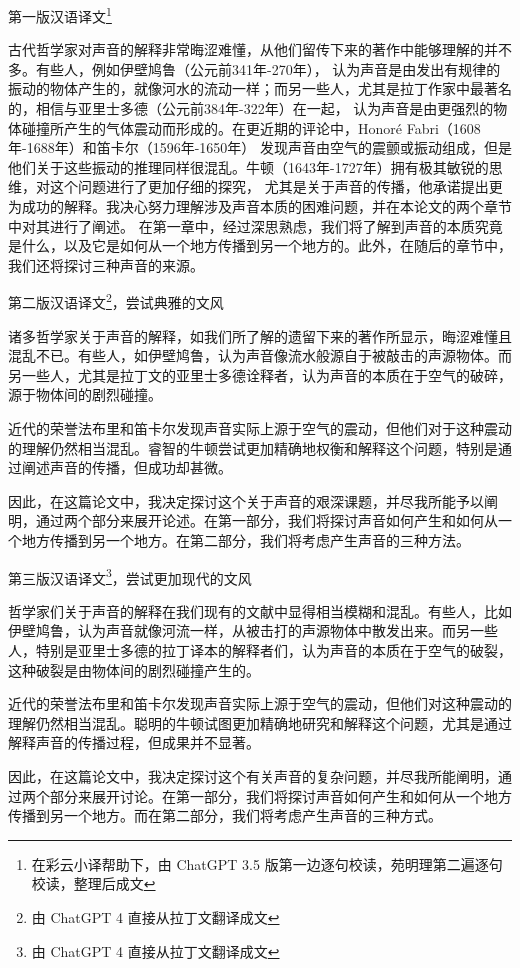 \documentclass[a4paper,12pt]{article}
\numberwithin{problem}{section}
\numberwithin{definition}{section}
\numberwithin{lemma}{section}
\numberwithin{proposition}{section}
\numberwithin{theorem}{section}
\numberwithin{grammar}{section}
\numberwithin{program}{section}
\numberwithin{convention}{section}
\numberwithin{corollary}{section}
\begin{document}
第一版汉语译文\footnote{在彩云小译帮助下，由 ChatGPT 3.5 版第一边逐句校读，苑明理第二遍逐句校读，整理后成文}
\begin{displayquote}
古代哲学家对声音的解释非常晦涩难懂，从他们留传下来的著作中能够理解的并不多。有些人，例如伊壁鸠鲁（公元前341年-270年），
认为声音是由发出有规律的振动的物体产生的，就像河水的流动一样；而另一些人，尤其是拉丁作家中最著名的，相信与亚里士多德（公元前384年-322年）在一起，
认为声音是由更强烈的物体碰撞所产生的气体震动而形成的。在更近期的评论中，Honoré Fabri（1608年-1688年）和笛卡尔（1596年-1650年）
发现声音由空气的震颤或振动组成，但是他们关于这些振动的推理同样很混乱。牛顿（1643年-1727年）拥有极其敏锐的思维，对这个问题进行了更加仔细的探究，
尤其是关于声音的传播，他承诺提出更为成功的解释。我决心努力理解涉及声音本质的困难问题，并在本论文的两个章节中对其进行了阐述。
在第一章中，经过深思熟虑，我们将了解到声音的本质究竟是什么，以及它是如何从一个地方传播到另一个地方的。此外，在随后的章节中，我们还将探讨三种声音的来源。
\end{displayquote}

第二版汉语译文\footnote{由 ChatGPT 4 直接从拉丁文翻译成文}，尝试典雅的文风
\begin{displayquote}
诸多哲学家关于声音的解释，如我们所了解的遗留下来的著作所显示，晦涩难懂且混乱不已。有些人，如伊壁鸠鲁，认为声音像流水般源自于被敲击的声源物体。而另一些人，尤其是拉丁文的亚里士多德诠释者，认为声音的本质在于空气的破碎，源于物体间的剧烈碰撞。

近代的荣誉法布里和笛卡尔发现声音实际上源于空气的震动，但他们对于这种震动的理解仍然相当混乱。睿智的牛顿尝试更加精确地权衡和解释这个问题，特别是通过阐述声音的传播，但成功却甚微。

因此，在这篇论文中，我决定探讨这个关于声音的艰深课题，并尽我所能予以阐明，通过两个部分来展开论述。在第一部分，我们将探讨声音如何产生和如何从一个地方传播到另一个地方。在第二部分，我们将考虑产生声音的三种方法。
\end{displayquote}

第三版汉语译文\footnote{由 ChatGPT 4 直接从拉丁文翻译成文}，尝试更加现代的文风
\begin{displayquote}
哲学家们关于声音的解释在我们现有的文献中显得相当模糊和混乱。有些人，比如伊壁鸠鲁，认为声音就像河流一样，从被击打的声源物体中散发出来。而另一些人，特别是亚里士多德的拉丁译本的解释者们，认为声音的本质在于空气的破裂，这种破裂是由物体间的剧烈碰撞产生的。

近代的荣誉法布里和笛卡尔发现声音实际上源于空气的震动，但他们对这种震动的理解仍然相当混乱。聪明的牛顿试图更加精确地研究和解释这个问题，尤其是通过解释声音的传播过程，但成果并不显著。

因此，在这篇论文中，我决定探讨这个有关声音的复杂问题，并尽我所能阐明，通过两个部分来展开讨论。在第一部分，我们将探讨声音如何产生和如何从一个地方传播到另一个地方。而在第二部分，我们将考虑产生声音的三种方式。
\end{displayquote}
\end{document}
